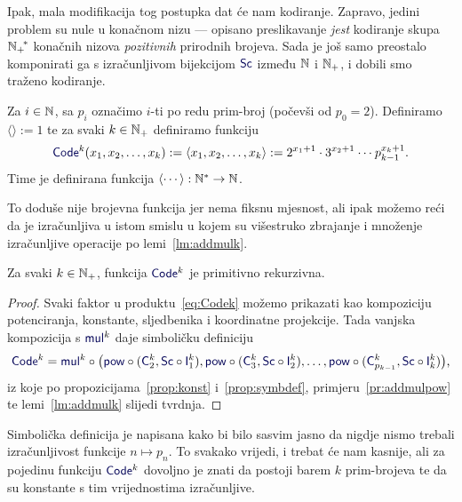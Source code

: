 Ipak, mala modifikacija tog postupka dat će nam kodiranje. Zapravo, jedini problem su nule u konačnom nizu --- opisano preslikavanje \emph{jest} kodiranje skupa ${{\mathbb N}_+\!}^*$ konačnih nizova \emph{pozitivnih} prirodnih brojeva. Sada je još samo preostalo komponirati ga s izračunljivom bijekcijom $\f{Sc}$ između ${\mathbb N}$ i ${\mathbb N}_+$, i dobili smo traženo kodiranje.

\begin{definicija}[{name=[kodiranje konačnih nizova prirodnih brojeva]}]
Za $i\in{\mathbb N}$, sa $p_i$ označimo $i$-ti po redu prim-broj (počevši od $p_0=2$). Definiramo $\langle\rangle:=1$ te za svaki $k\in{\mathbb N}_+$ definiramo funkciju
\begin{equation}\label{eq:Codek}
    \f{Code}^k(x_1,x_2,\dotsc,x_k):=\langle x_1,x_2,\dotsc,x_k\rangle:=2^{x_1+1}\cdot3^{x_2+1}\mathbin{\dotsm}p_{k-1}^{x_k+1}\text.
\end{equation}
Time je definirana funkcija $\langle\cdots\rangle:{\mathbb N}^*\to{\mathbb N}$.
\end{definicija}

To doduše nije brojevna funkcija jer nema fiksnu mjesnost, ali ipak možemo reći da je izračunljiva u istom smislu u kojem su višestruko zbrajanje i množenje izračunljive operacije po lemi~\ref{lm:addmulk}.

\begin{propozicija}[{name=[primitivna rekurzivnost kodiranja konačnih nizova]}]\label{prop:Codekprn}
Za svaki $k\in{\mathbb N}_+$, funkcija $\f{Code}^k$ je primitivno rekurzivna.
\end{propozicija}
\begin{proof}
    Svaki faktor u produktu~\eqref{eq:Codek} možemo prikazati kao kompoziciju potenciranja, konstante, sljedbenika i koordinatne projekcije. Tada vanjska kompozicija s $\f{mul}^k$ daje simboličku definiciju
    \begin{equation}\f{Code}^k=\f{mul}^k\circ\bigl(\f{pow}\circ(\f C_2^k,\f{Sc}\circ\f I_1^k),\f{pow}\circ(\f C_3^k,\f{Sc}\circ\f I_2^k),\dotsc,\f{pow}\circ(\f C_{p_{k-1}}^k,\f{Sc}\circ\f I_k^k)\bigr)\text,
    \end{equation}
    iz koje po propozicijama~\ref{prop:konst} i~\ref{prop:symbdef}, primjeru~\ref{pr:addmulpow} te lemi~\ref{lm:addmulk} slijedi tvrdnja.
\end{proof}

Simbolička definicija je napisana kako bi bilo sasvim jasno da nigdje nismo trebali izračunljivost funkcije $n\mapsto p_n$. To svakako vrijedi, i trebat će nam kasnije, ali za pojedinu funkciju $\f{Code}^k$ dovoljno je znati da postoji barem $k$ prim-brojeva te da su konstante s tim vrijednostima izračunljive.

